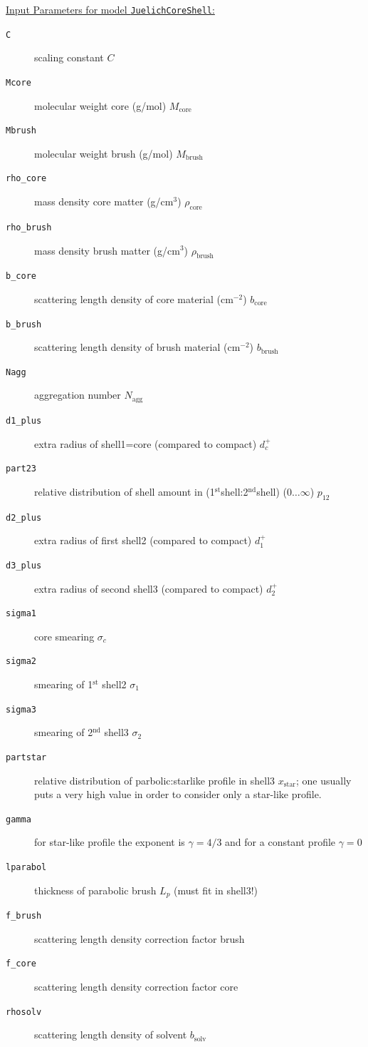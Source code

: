 \vspace{5mm}
\noindent \underline{Input Parameters for model \texttt{JuelichCoreShell}:}
\begin{description}
\item[\texttt{C}] scaling constant $C$
\item[\texttt{Mcore}] molecular weight core (g/mol) $M_\text{core}$
\item[\texttt{Mbrush}] molecular weight brush (g/mol) $M_\text{brush}$
\item[\texttt{rho\_core}] mass density core matter (g/cm$^3$) $\rho_\text{core}$
\item[\texttt{rho\_brush}] mass density brush matter (g/cm$^3$) $\rho_\text{brush}$
\item[\texttt{b\_core}] scattering length density of core material (cm$^{-2}$) $b_\text{core}$
\item[\texttt{b\_brush}] scattering length density of brush material (cm$^{-2}$) $b_\text{brush}$
\item[\texttt{Nagg}] aggregation number $N_\text{agg}$
\item[\texttt{d1\_plus}] extra radius of shell1=core (compared to compact) $d_c^+$
\item[\texttt{part23}] relative distribution of shell amount in
                (1$^\text{st}$shell:2$^\text{nd}$shell) ($0\ldots\infty$) $p_{12}$
\item[\texttt{d2\_plus}] extra radius of first shell2 (compared to compact) $d_1^+$
\item[\texttt{d3\_plus}] extra radius of second shell3 (compared to compact) $d_2^+$
\item[\texttt{sigma1}] core smearing $\sigma_c$
\item[\texttt{sigma2}] smearing of 1$^\text{st}$ shell2 $\sigma_1$
\item[\texttt{sigma3}] smearing of 2$^\text{nd}$ shell3 $\sigma_2$
\item[\texttt{partstar}] relative distribution of parbolic:starlike profile in shell3 $x_\text{star}$;
        one usually puts a very high value in order to consider only a star-like profile.
\item[\texttt{gamma}] for star-like profile the exponent is $\gamma=4/3$ and
    for a constant profile $\gamma=0$
\item[\texttt{lparabol}] thickness of parabolic brush $L_p$ (must fit in shell3!)
\item[\texttt{f\_brush}] scattering length density correction factor brush
\item[\texttt{f\_core}] scattering length density correction factor core
\item[\texttt{rhosolv}] scattering length density of solvent $b_\textrm{solv}$
\end{description}


